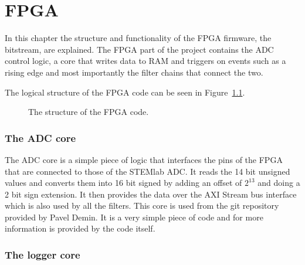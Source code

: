\chapter{FPGA}
\label{ch:fpga}

In this chapter the structure and functionality of the FPGA firmware, the bitstream, are explained.
The FPGA part of the project contains the ADC control logic, a core that writes data to RAM and triggers on events such as a rising edge and most importantly the filter chains that connect the two.

The logical structure of the FPGA code can be seen in Figure~\ref{fig:fpga:structure}.

\begin{figure}
    \caption{The structure of the FPGA code.}
    \label{fig:fpga:structure}
\end{figure}

\subsection{The ADC core}
\label{subsec:fpga:adc}

The ADC core is a simple piece of logic that interfaces the pins of the FPGA that are connected to those of the STEMlab ADC. It reads the 14 bit unsigned values and converts them into 16 bit signed by adding an offset of $2^{13}$ and doing a 2 bit sign extension.
It then provides the data over the AXI Stream bus interface which is also used by all the filters.
This core is used from the git repository provided by Pavel Demin\cite{TODO:link}. It is a very simple piece of code and for more information is provided by the code itself.

\subsection{The logger core}
\label{subsec:fpga:logger}